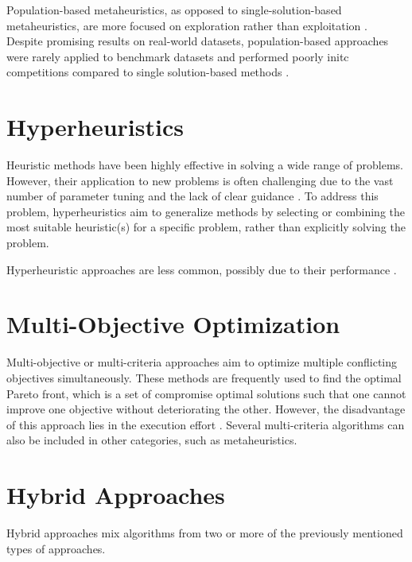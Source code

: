 Population-based metaheuristics, as opposed to single-solution-based metaheuristics, are more focused on exploration rather than exploitation \cite{talbi2009metaheuristics,du2016search}. Despite promising results on real-world datasets, population-based approaches were rarely applied to benchmark datasets and performed poorly in\ac{itc} competitions compared to single solution-based methods \cite{abdipoor_meta-heuristic_2023}.


\section{Hyperheuristics}

Heuristic methods have been highly effective in solving a wide range of problems. However, their application to new problems is often challenging due to the vast number of parameter tuning and the lack of clear guidance \cite{hyper_heuristics_survey}. To address this problem, hyperheuristics aim to generalize methods by selecting or combining the most suitable heuristic(s) for a specific problem, rather than explicitly solving the problem.

Hyperheuristic approaches are less common, possibly due to their performance \cite{chen_survey_2021}.

\section{Multi-Objective Optimization}\label{sec:mo}

Multi-objective or multi-criteria approaches aim to optimize multiple conflicting objectives simultaneously. These methods are frequently used to find the optimal Pareto front, which is a set of compromise optimal solutions such that one cannot improve one objective without deteriorating the other. However, the disadvantage of this approach lies in the execution effort \cite{chen_survey_2021}. Several multi-criteria algorithms can also be included in other categories, such as metaheuristics.

\section{Hybrid Approaches}

Hybrid approaches mix algorithms from two or more of the previously mentioned types of approaches.

